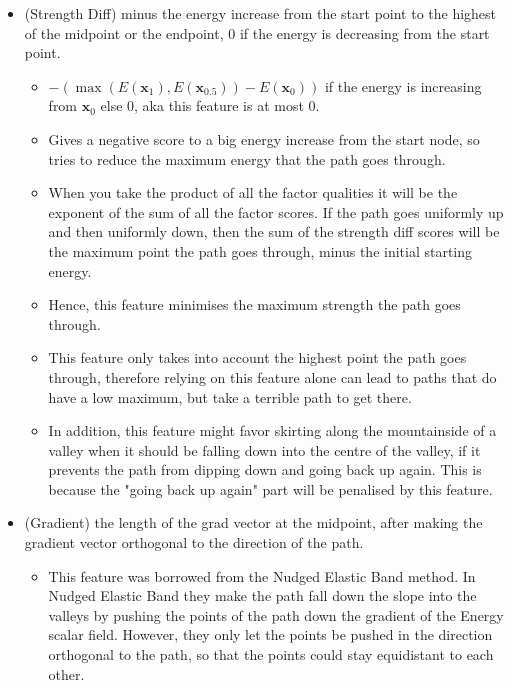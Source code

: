 \begin{itemize}
\begin{itemize}
    \end{itemize}
    \item (Strength Diff) minus the energy increase from the start point to the highest of the midpoint or the endpoint, 0 if the energy is decreasing from the start point.
    \begin{itemize}
        \item $-(\max(E(\mathbf{x}_1), E(\mathbf{x}_{0.5})) - E(\mathbf{x}_0))$ if the energy is increasing from $\mathbf{x}_0$ else 0, aka this feature is at most 0.
        \item Gives a negative score to a big energy increase from the start node, so tries to reduce the maximum energy that the path goes through.
        \item When you take the product of all the factor qualities it will be the exponent of the sum of all the factor scores.
        If the path goes uniformly up and then uniformly down, then the sum of the strength diff scores will be the maximum point the path goes through, minus the initial starting energy.
        \item Hence, this feature minimises the maximum strength the path goes through.
        \item This feature only takes into account the highest point the path goes through, therefore relying on this feature alone can lead to paths that do have a low maximum, but take a terrible path to get there.
        \item In addition, this feature might favor skirting along the mountainside of a valley when it should be falling down into the centre of the valley, if it prevents the path from dipping down and going back up again.
        This is because the "going back up again" part will be penalised by this feature.
    \end{itemize}
    \item (Gradient) the length of the grad vector at the midpoint, after making the gradient vector orthogonal to the direction of the path.
    \begin{itemize}
        \item This feature was borrowed from the Nudged Elastic Band method.
        In Nudged Elastic Band they make the path fall down the slope into the valleys by pushing the points of the path down the gradient of the Energy scalar field.
        However, they only let the points be pushed in the direction orthogonal to the path, so that the points could stay equidistant to each other.

\end{itemize}
\end{itemize}
